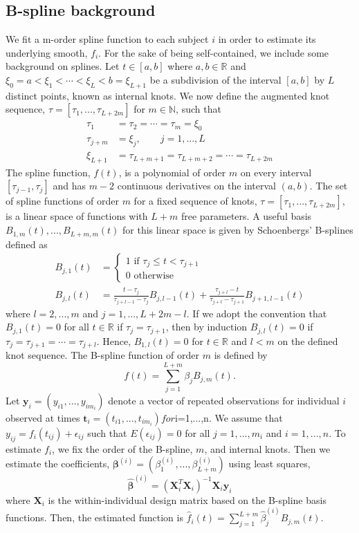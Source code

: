 \documentclass[12pt]{article}
\newcommand{\B}[0]{\mathbf}
\newcommand{\bs}[0]{\boldsymbol}
\begin{document}
\subsection{B-spline background}
We fit a m-order spline function to each subject $i$ in order to estimate its underlying smooth, $f_i$. For the sake of being self-contained, we include some background on splines. Let $t\in[a,b]$ where $a,b\in\mathbb{R}$ and $\xi_0=a<\xi_{1}<\cdots<\xi_{L} < b = \xi_{L+1}$ be a subdivision of  the interval $[a,b]$ by $L$ distinct points, known as internal knots. We now define the augmented knot sequence, $\tau=[\tau_{1},...,\tau_{L+2m}]$ for $m\in\mathbb{N}$, such that 
\begin{align*}
\tau_{1}&=\tau_{2}=\cdots =\tau_{m} =\xi_{0}\\
\tau_{j+m}& = \xi_{j}, \quad\quad j=1,...,L\\
\xi_{L+1}&=\tau_{L+m+1}=\tau_{L+m+2}=\cdots =\tau_{L+2m} 
\end{align*}
The spline function, $f(t)$, is a polynomial of order $m$ on every interval $[\tau_{j-1},\tau_{j}]$ and has $m-2$ continuous derivatives on the interval $(a,b)$. The set of spline functions of order $m$ for a fixed sequence of knots, $\tau = [\tau_1,...,\tau_{L+2m}]$, is a linear space of functions with $L+m$ free parameters. A useful basis $B_{1,m}(t),...,B_{L+m,m}(t)$ for this linear space is given by Schoenbergs' B-splines \cite{curry1966, de1976} defined as
\begin{align*}
B_{j,1}(t) &= \begin{cases}
1 \text{ if }\tau_j\leq t < \tau_{j+1}\\
0\text{ otherwise}
\end{cases}\\
B_{j,l}(t) &= \frac{t-\tau_j}{\tau_{j+l-1}-\tau_j} B_{j,l-1}(t)+\frac{\tau_{j+l}-t}{\tau_{j+l}-\tau_{j+1}} B_{j+1,l-1}(t)
\end{align*}
where $l=2,...,m$ and $j=1,...,L+2m-l$.  If we adopt the convention that $B_{j,1}(t)=0$ for all $t\in\mathbb{R}$ if $\tau_{j}=\tau_{j+1}$, then by induction $B_{j,l}(t)=0$ if $\tau_{j}=\tau_{j+1}=\cdots=\tau_{j+l}$. Hence, $B_{1,l}(t)=0$ for $t\in\mathbb{R}$ and $l<m$ on the defined knot sequence. The B-spline function of order $m$ is defined by
$$f(t) = \sum^{L+m}_{j=1} \beta_j B_{j,m}(t).$$
Let $\B y_{i}=(y_{i1},...,y_{im_{i}})$ denote a vector of repeated observations for individual $i$ observed at times $\B t_{i}=(t_{i1},...,t_{im_{i}})  for $i=1,...,n$.$ We assume that $y_{ij} = f_{i}(t_{ij}) + \epsilon_{ij}$ such that $E(\epsilon_{ij}) = 0$ for all $j=1,...,m_{i}$ and $i=1,...,n$.  To estimate $f_{i}$, we fix the order of the B-spline, $m$, and internal knots. Then we estimate the coefficients, $\bs \beta^{(i)} = (\beta^{(i)}_1,...,\beta^{(i)}_{L+m})$ using least squares, 
$$\hat{\bs \beta}^{(i)} = (\B X_{i}^{T}\B X_{i})^{-1}\B X_{i}\B y_{i}$$
where $\B X_{i}$ is the within-individual design matrix based on the B-spline basis functions. Then, the estimated function is $\hat{f}_i(t)=\sum^{L+m}_{j=1} \hat{\beta}^{(i)}_j B_{j,m}(t)$. \\
\end{document}
